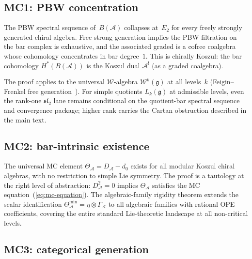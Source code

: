 \documentclass[11pt,reqno]{amsart}
\theoremstyle{definition}
\theoremstyle{remark}
\newcommand{\cA}{\mathcal{A}}
\newcommand{\cW}{\mathcal{W}}
\newcommand{\fg}{\mathfrak{g}}
\numberwithin{equation}{section}
\begin{document}
\subsection{MC1: PBW concentration}
\label{ssec:mc1}

The PBW spectral sequence of~$B(\cA)$ collapses at~$E_2$
for every freely strongly generated chiral algebra. Free
strong generation implies the PBW filtration on the bar
complex is exhaustive, and the associated graded is a
cofree coalgebra whose cohomology concentrates in bar
degree~$1$. This is chirally Koszul: the bar cohomology
$H^*(B(\cA))$ is the Koszul dual $\cA^!$ (as a graded
coalgebra).

The proof applies to the universal $\cW$-algebra
$\cW^k(\fg)$ at all levels~$k$ (Feigin--Frenkel free
generation~\cite{FF92,FBZ04}). For simple quotients $L_k(\fg)$ at
admissible levels, even the rank-one $\mathfrak{sl}_2$ lane remains
conditional on the quotient-bar spectral sequence and convergence
package; higher rank carries the Cartan obstruction described in the
main text.

\subsection{MC2: bar-intrinsic existence}
\label{ssec:mc2}

The universal MC element $\Theta_\cA = D_\cA - d_0$
exists for all modular Koszul chiral algebras, with no
restriction to simple Lie symmetry. The proof is a
tautology at the right level of abstraction: $D_\cA^2 = 0$
implies $\Theta_\cA$ satisfies the MC
equation~(\ref{eq:mc-equation}). The algebraic-family
rigidity theorem extends the scalar identification
$\Theta_\cA^{\min} = \eta \otimes \Gamma_\cA$ to all
algebraic families with rational OPE coefficients, covering
the entire standard Lie-theoretic landscape at all
non-critical levels.

\subsection{MC3: categorical generation}
\label{ssec:mc3}
\end{document}
